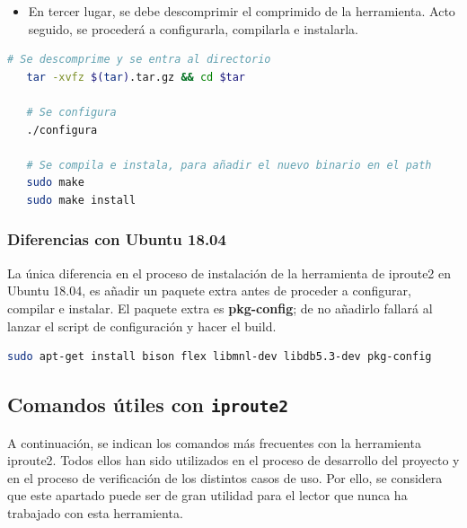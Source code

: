 \begin{itemize}
    \item En tercer lugar, se debe descomprimir el comprimido de la herramienta. Acto seguido, se procederá a configurarla, compilarla e instalarla.
\end{itemize}

\begin{lstlisting}[language= bash, style=Consola, caption={Compilación e instalación de Iproute2},label=code:iproute2_install]
   # Se descomprime y se entra al directorio
   tar -xvfz $(tar).tar.gz && cd $tar
   
   # Se configura
   ./configura
   
   # Se compila e instala, para añadir el nuevo binario en el path
   sudo make
   sudo make install
\end{lstlisting}
\subsubsection{Diferencias con Ubuntu 18.04}

La única diferencia en el proceso de instalación de la herramienta de iproute2 en Ubuntu 18.04, es añadir un paquete extra antes de proceder a configurar, compilar e instalar. El paquete extra es \textbf{pkg-config}; de no añadirlo fallará al lanzar el script de configuración y hacer el build.
\begin{lstlisting}[language= bash, style=Consola, caption={Instalación de las dependencias de Iproute2 - Ubuntu 18.04},label=code:iproute2_deps18]
    sudo apt-get install bison flex libmnl-dev libdb5.3-dev pkg-config
\end{lstlisting}

\subsection{Comandos útiles con \texttt{iproute2}}

A continuación, se indican los comandos más frecuentes con la herramienta iproute2. Todos ellos han sido utilizados en el proceso de desarrollo del proyecto y en el proceso de verificación de los distintos casos de uso. Por ello, se considera que este apartado puede ser de gran utilidad para el lector que nunca ha trabajado con esta herramienta.

